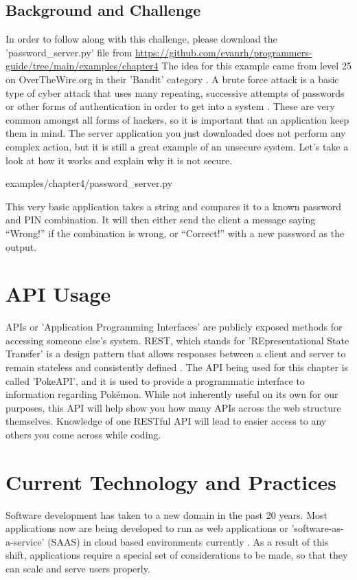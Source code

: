 \documentclass[12pt, oneside, a4paper]{book}
\begin{document}
      \subsection{Background and Challenge}
      In order to follow along with this challenge, please download the 'password\_server.py' file from \url{https://github.com/evanrh/programmers-guide/tree/main/examples/chapter4}
      The idea for this example came from level 25 on OverTheWire.org in their 'Bandit' category \autocite{overthewireOverTheWireLevelGoal}.
      A brute force attack is a basic type of cyber attack that uses many repeating, successive attempts of passwords or other forms of authentication in order to get into a system \autocite{universityGrowingCybersecurityThreats2019}.
      These are very common amongst all forms of hackers, so it is important that an application keep them in mind.
      The server application you just downloaded does not perform any complex action, but it is still a great example of an unsecure system.
      Let's take a look at how it works and explain why it is not secure.

      
      {examples/chapter4/password_server.py}

      This very basic application takes a string and compares it to a known password and PIN combination.
      It will then either send the client a message saying ``Wrong!'' if the combination is wrong, or ``Correct!'' with a new password as the output.
      \section{API Usage}
      APIs or 'Application Programming Interfaces' are publicly exposed methods for accessing someone else's system.
      REST, which stands for 'REpresentational State Transfer' is a design pattern that allows responses between a client and server to remain stateless and consistently defined \autocite{hallettPokeAPI}.
      The API being used for this chapter is called 'PokeAPI', and it is used to provide a programmatic interface to information regarding Pokémon.
      While not inherently useful on its own for our purposes, this API will help show you how many APIs across the web structure themselves.
      Knowledge of one RESTful API will lead to easier access to any others you come across while coding.

      \section{Current Technology and Practices}
      Software development has taken to a new domain in the past 20 years.
      Most applications now are being developed to run as web applications or 'software-as-a-service' (SAAS) in cloud based environments currently \autocite{WhatCloudComputing}.
      As a result of this shift, applications require a special set of considerations to be made, so that they can scale and serve users properly.
\end{document}
